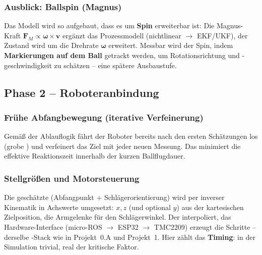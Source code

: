 \subsubsection{Ausblick: Ballspin (Magnus)}
Das Modell wird so aufgebaut, dass es um \textbf{Spin} erweiterbar ist: Die
Magnus-Kraft $\mathbf{F}_M\propto \boldsymbol\omega\times\mathbf{v}$ ergänzt das
Prozessmodell (nichtlinear $\rightarrow$ EKF/UKF), der Zustand wird um die
Drehrate $\boldsymbol\omega$ erweitert. Messbar wird der Spin, indem
\textbf{Markierungen auf dem Ball} getrackt werden, um Rotationsrichtung und
-geschwindigkeit zu schätzen -- eine spätere Ausbaustufe.

\subsection{Phase 2 -- Roboteranbindung}

\subsubsection{Frühe Abfangbewegung (iterative Verfeinerung)}
Gemäß der Ablauflogik fährt der Roboter bereits nach den ersten Schätzungen los
(grobe ) und verfeinert das Ziel mit jeder neuen Messung. Das
minimiert die effektive Reaktionszeit innerhalb der kurzen Ballflugdauer.

\subsubsection{Stellgrößen und Motorsteuerung}
Die geschätzte  (Abfangpunkt + Schlägerorientierung) wird per
inverser Kinematik in Achswerte umgesetzt: $x,z$ (und optional $y$) aus der
kartesischen Zielposition, die Armgelenke für den Schlägerwinkel. Der
 interpoliert, das Hardware-Interface
(micro-ROS $\rightarrow$ ESP32 $\rightarrow$ TMC2209) erzeugt die Schritte --
derselbe -Stack wie in Projekt~0.A und Projekt~1. Hier zählt
das \textbf{Timing}: in der Simulation trivial, real der kritische Faktor.

